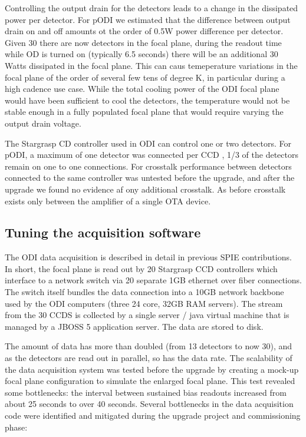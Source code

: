 \documentclass[draft]{spieman}
\begin{document}
Controlling the output drain for the detectors leads to a change in the dissipated power per detector. 
For pODI we estimated that the difference between output drain on and off amounts ot the order of 
0.5W power difference per detector. Given 30 there are now detectors in the focal plane, during the 
readout time while OD is turned on (typically 6.5 seconds) there will be an additional 30 Watts 
dissipated in the focal plane. This can caus temeperature variations in the focal plane of the order of 
several  few tens of  degree K, in particular during a high cadence use case. While the total cooling 
power of the ODI focal plane would have been sufficient to cool the detectors, the temperature would 
not be stable enough in a fully populated focal plane that would require varying the output drain 
voltage. 


The Stargrasp CD controller used in ODI can control one or two detectors. For pODI, a maximum of one 
detector was connected per CCD , 1/3 of the detectors remain on one to one connections.  For 
crosstalk performance between detectors connected to the same controller was untested before the 
upgrade, and after the upgrade we found no evidence af ony additional crosstalk. As before crosstalk 
exists only between the amplifier of a single OTA device. 



\subsection{Tuning the acquisition software}

The ODI data acquisition is described in detail in previous SPIE
 contributions\cite{Yeatts2008,Yeatts2010}.
In short, the focal plane is read out by 20 Stargrasp CCD controllers which
interface to a network switch via 20 separate 1GB ethernet over fiber
connections. The switch itself bundles the data connection into a 10GB network
backbone used by the ODI computers (three 24 core, 32GB RAM servers). The stream
from the 30 CCDS is collected by a single server / java virtual machine that is
managed by a JBOSS 5 application server. The data are stored to disk.

The amount of data has more than doubled (from 13 detectors to now 30), and as
the detectors are read out in parallel, so has the data rate. The scalability of
the data acquisition system was tested before the upgrade by creating a mock-up
focal plane  configuration to simulate the enlarged focal plane. This test
revealed some bottlenecks: the interval between sustained bias readouts
increased from about 25 seconds to over 40 seconds. Several bottlenecks in the
data acquisition code were identified and mitigated during the upgrade project
and commissioning phase:
\end{document}
